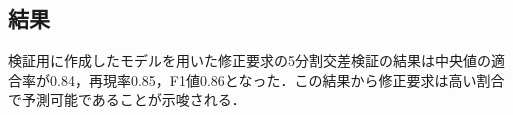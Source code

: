 \documentclass[T,J]{fose} %
\begin{document}








\subsection{結果}
検証用に作成したモデルを用いた修正要求の5分割交差検証の結果は中央値の適合率が0.84，再現率0.85，F1値0.86となった．この結果から修正要求は高い割合で予測可能であることが示唆される．
\end{document}
